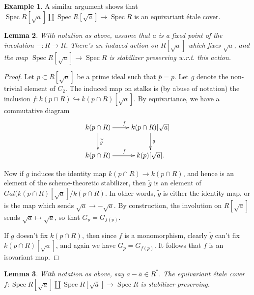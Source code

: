 \documentclass[edeposit,fullpage]{uiucthesis2009}
\DeclareMathOperator{\Spec}{Spec}
\theoremstyle{plain}
\newtheorem{lemma}{Lemma}
\numberwithin{lemma}{section}
\newtheorem{proposition}[lemma]{Proposition}
\theoremstyle{definition}
\newtheorem{example}[lemma]{Example}
\begin{document}
\begin{example}
A similar argument shows that $\Spec R[\sqrt{a}] \coprod \Spec
R[\sqrt{\overline a}] \rightarrow \Spec R$ is an equivariant \'etale cover.
\end{example}

\begin{lemma}
With notation as above, assume that $a$ is a fixed point of the
involution $- : R \rightarrow R$. There's an induced action on $ R[\sqrt{a}]$
which fixes $\sqrt{a}$, and the map $\Spec R[\sqrt{a}] \rightarrow
\Spec R$ is stabilizer preserving w.r.t. this action.
\end{lemma}

\begin{proof}
Let $p \subset
R[\sqrt{a}]$ be a prime ideal such that $\overline p = p$. Let $g$ denote the
non-trivial element of $C_2$. The induced map on stalks is (by abuse
of notation) the
inclusion $f : k(p \cap R) \hookrightarrow k(p \cap R)[\sqrt{a}]$. By equivariance,
we have a commutative diagram
\[
\xymatrix{k(p \cap R) \ar[r]^f \ar[d]^{\widetilde g} & k(p \cap R)[\sqrt{a}] \ar[d]^g \\
  k(p \cap R) \ar[r]^f & k(p)[\sqrt{a}].}
\]

Now if $g$ induces the identity map $k(p \cap R) \rightarrow k(p \cap
R)$, and hence is an element of the scheme-theoretic stabilizer, then
$\widetilde g$ is an element of $Gal(k(p \cap R)[\sqrt{a}]/k(p \cap
R)$. In other words, $\widetilde g$ is either the identity map, or is
the map which sends $\sqrt{a} \rightarrow -\sqrt{a}$. By construction,
the involution on $R[\sqrt{a}]$ sends $\sqrt{a} \mapsto \sqrt{a}$, so
that $G_p = G_{f(p)}$.

If $g$ doesn't fix $k(p \cap R)$, then since $f$ is a monomorphism, clearly $\widetilde g$ can't
fix $k(p \cap R)[\sqrt{a}]$, and again we have $G_p = G_{f(p)}$. It
follows that $f$ is an isovariant map. 
\end{proof}







\begin{lemma}
With notation as above, say $a - 
\overline a \in R^*$. The equivariant \'etale cover $f : \Spec R[\sqrt{a}] \coprod \Spec
R[\sqrt{\overline a}] \rightarrow \Spec R$ is stabilizer preserving.
\end{lemma}
\end{document}
